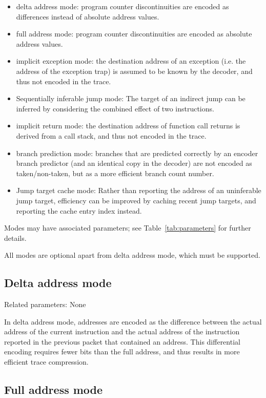 \begin{itemize}
  \item delta address mode:
    program counter discontinuities are encoded as differences instead of absolute address values.
  \item full address mode:
    program counter discontinuities are encoded as absolute address values.
  \item implicit exception mode:
    the destination address of an exception (i.e. the address of the exception trap) is assumed to 
    be known by the decoder, and thus not encoded in the trace.
  \item Sequentially inferable jump mode:
    The target of an indirect jump can be inferred by considering the combined effect of two instructions. 
  \item implicit return mode:
    the destination address of function call returns is derived from a call stack, and thus not encoded
    in the trace.
  \item branch prediction mode:
    branches that are predicted correctly by an encoder branch predictor (and an identical copy in the decoder)
    are not encoded as taken/non-taken, but as a more efficient branch count number.
  \item Jump target cache mode:
    Rather than reporting the address of an uninferable jump target, efficiency can be improved by caching
    recent jump targets, and reporting the cache entry index instead.
\end{itemize}

Modes may have associated parameters; see Table~\ref{tab:parameters} for further details.

All modes are optional apart from delta address mode, which must be supported.

\subsection{Delta address mode} \label{sec:delta-address}

Related parameters: None

In delta address mode, addresses are encoded as the difference between the actual address of 
the current instruction and the actual address of the instruction reported in the 
previous packet that contained an address.  This differential encoding requires fewer bits than 
the full address, and thus results in more efficient trace compression.

\subsection{Full address mode} \label{sec:full-address}

